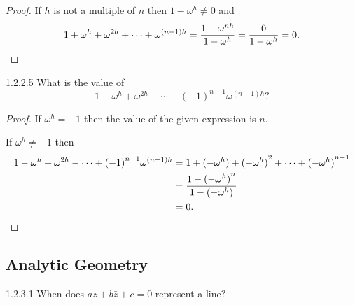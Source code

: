 \begin{proof}
	If \( h \) is not a multiple of \( n \) then \( 1 - \omega^{h} \ne 0 \) and
	\[
		1 + \omega^{h} + \omega^{2h} + \cdots + \omega^{(n-1)h} = \dfrac{1 - \omega^{nh}}{1 - \omega^{h}} = \dfrac{0}{1 - \omega^{h}} = 0.\qedhere
	\]
\end{proof}

\begin{problem}{1.2.2.5}
What is the value of
\[
	1 - \omega^{h} + \omega^{2h} - \cdots + {(-1)}^{n-1}\omega^{(n-1)h} ?
\]
\end{problem}

\begin{proof}
	If \( \omega^{h} = -1 \) then the value of the given expression is \( n \).

	If \( \omega^{h} \ne -1 \) then
	\begingroup
	\allowdisplaybreaks%
	\begin{align*}
		1 - \omega^{h} + \omega^{2h} - \cdots + {(-1)}^{n-1}\omega^{(n-1)h} & = 1 + {(-\omega^{h})} + {(-\omega^{h})}^{2} + \cdots + {(-\omega^{h})}^{n-1} \\
		                                                                    & = \dfrac{1 - {(-\omega^{h})}^{n}}{1 - {(-\omega^{h})}}                       \\
		                                                                    & = 0.\qedhere
	\end{align*}
	\endgroup
\end{proof}

\subsection{Analytic Geometry}

\begin{problem}{1.2.3.1}
When does \( az + b\bar{z} + c = 0 \) represent a line?
\end{problem}

